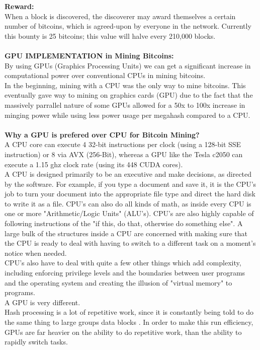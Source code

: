 \documentclass[a4paper,11pt]{article}
\begin{document}
\textbf{Reward:}\\
When a block is discovered, the discoverer may award themselves a certain number of bitcoins, which is agreed-upon by everyone in the network. Currently this bounty is 25 bitcoins; this value will halve every 210,000 blocks.\\\\
\textbf{GPU IMPLEMENTATION in Mining Bitcoins:}\\
By using GPUs (Graphics Processing Units) we can get a significant increase in computational power over conventional CPUs in mining bitcoins.\\
In the beginning, mining with a CPU was the only way to mine bitcoins. This eventually gave way to mining on graphics cards (GPU) due to the fact that the massively parrallel nature of some GPUs allowed for a 50x to 100x increase in minging power while using less power usage per megahash compared to a CPU.\\\\
\textbf{Why a GPU is prefered over CPU for Bitcoin Mining?}\\
A CPU core can execute 4 32-bit instructions per clock (using a 128-bit SSE instruction) or 8 via AVX (256-Bit), whereas a GPU like the  Tesla c2050 can execute a 1.15 ghz clock rate (using its 448 CUDA cores). \\
A CPU is designed primarily to be an executive and make decisions, as directed by the software. For example, if you type a document and save it, it is the CPU's job to turn your document into the appropriate file type and direct the hard disk to write it as a file. CPU's can also do all kinds of math, as inside every CPU is one or more "Arithmetic/Logic Units" (ALU's). CPU's are also highly capable of following instructions of the "if this, do that, otherwise do something else". A large bulk of the structures inside a CPU are concerned with making sure that the CPU is ready to deal with having to switch to a different task on a moment's notice when needed.\\
CPU's also have to deal with quite a few other things which add complexity, including enforcing privilege levels and the boundaries between user programs and the operating system and creating the illusion of "virtual memory" to programs.\\
A GPU is very different. \\
Hash processing is a lot of repetitive work, since it is constantly being told to do the same thing to large groups data blocks . In order to make this run efficiency, GPUs are far heavier on the ability to do repetitive work, than the ability to rapidly switch tasks.\\
\end{document}
